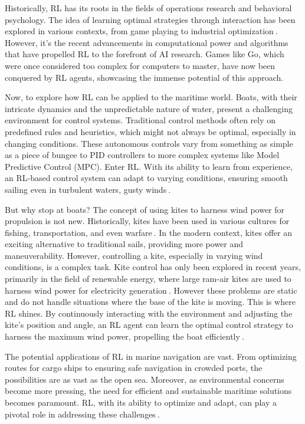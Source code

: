 Historically, RL has its roots in the fields of operations research and behavioral psychology. The idea of learning optimal strategies through interaction has been explored in various contexts, from game playing to industrial optimization$~$\cite{bellman1957dynamic}. However, it's the recent advancements in computational power and algorithms that have propelled RL to the forefront of AI research. Games like Go, which were once considered too complex for computers to master, have now been conquered by RL agents, showcasing the immense potential of this approach\cite{silver2016mastering}.

Now, to explore how RL can be applied to the maritime world. Boats, with their intricate dynamics and the unpredictable nature of water, present a challenging environment for control systems. Traditional control methods often rely on predefined rules and heuristics, which might not always be optimal, especially in changing conditions. These autonomous controls vary from something as simple as a piece of bungee to PID controllers to more complex systems like Model Predictive Control (MPC). Enter RL. With its ability to learn from experience, an RL-based control system can adapt to varying conditions, ensuring smooth sailing even in turbulent waters, gusty winds$~$\cite{yang2020reinforcement}.

But why stop at boats? The concept of using kites to harness wind power for propulsion is not new. Historically, kites have been used in various cultures for fishing, transportation, and even warfare$~$\cite{hallion2003taking}. In the modern context, kites offer an exciting alternative to traditional sails, providing more power and maneuverability. However, controlling a kite, especially in varying wind conditions, is a complex task.  Kite control has only been explored in recent years, primarily in the field of renewable energy, where large ram-air kites are used to harness wind power for electricity generation$~$\cite{kitecontrol}. However these problems are static and do not handle situations where the base of the kite is moving. This is where RL shines. By continuously interacting with the environment and adjusting the kite's position and angle, an RL agent can learn the optimal control strategy to harness the maximum wind power, propelling the boat efficiently$~$\cite{erhard2013control}.

The potential applications of RL in marine navigation are vast. From optimizing routes for cargo ships to ensuring safe navigation in crowded ports, the possibilities are as vast as the open sea. Moreover, as environmental concerns become more pressing, the need for efficient and sustainable maritime solutions becomes paramount. RL, with its ability to optimize and adapt, can play a pivotal role in addressing these challenges$~$\cite{christiansen2013ship}.

